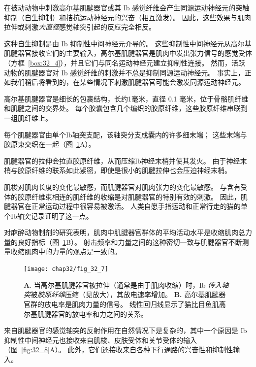在被动动物中刺激高尔基肌腱器官或其 Ib 感觉纤维会产生同源运动神经元的突触抑制（自生抑制）和拮抗运动神经元的兴奋（相互激发）。
因此，这些效果与肌肉拉伸或刺激\textit{大直径}感觉轴突引起的反应完全相反。


这种自生抑制是由 Ib 抑制性中间神经元介导的。
这些抑制性中间神经元从高尔基肌腱器官接收它们的主要输入，高尔基肌腱器官是肌肉中发出张力信号的感觉受体（方框~\ref{box:32_4}），并且它们与同名运动神经元建立抑制性连接。
然而，活跃动物的肌腱器官对 Ib 感觉纤维的刺激并不总是抑制同源运动神经元。
事实上，正如我们稍后将看到的，在某些情况下刺激肌腱器官可能会激发同源运动神经元。


\begin{proposition}[神经解剖学导航术语] \label{box:32_4}
	
	\quad \quad 高尔基肌腱器官是细长的包裹结构，长约1毫米，直径 0.1 毫米，位于骨骼肌纤维和肌腱之间的交界处。
	每个胶囊包含几个编织的胶原纤维，这些胶原纤维串联到一组肌纤维上。
	
	\quad \quad 每个肌腱器官由单个Ib轴突支配，该轴突分支成囊内的许多细末端；
	这些末端与胶原束交织在一起（图~\ref{fig:32_7}A）。
	
	\quad \quad 肌腱器官的拉伸会拉直胶原纤维，从而压缩Ib神经末梢并使其发火。
	由于神经末梢与胶原纤维的联系如此紧密，即使是很小的肌腱拉伸也会压迫神经末梢。
	
	\quad \quad 肌梭对肌肉长度的变化最敏感，而肌腱器官对肌肉张力的变化最敏感。
	与含有受体的胶原纤维束相连的肌纤维的收缩是对肌腱器官的特别有效的刺激。
	因此，肌腱器官在正常运动过程中很容易被激活。
	人类自愿手指运动和正常行走的猫的单个Ib轴突记录证明了这一点。
	
	\quad \quad 对麻醉动物制剂的研究表明，肌肉中肌腱器官群体的平均活动水平是收缩肌肉总力量的良好指标（图~\ref{fig:32_7}B）。
	射击频率和力量之间的这种密切一致与肌腱器官不断测量收缩肌肉中的力量的观点是一致的。
	
\end{proposition}


\begin{figure}[htbp]
	\centering
	\texttt{[image: chap32/fig\_32\_7]}
	\caption{\textbf{A}. 当高尔基肌腱器官被拉伸（通常是由于肌肉收缩）时，Ib \textit{传入轴突}被\textit{胶原纤维}压缩（见放大），其放电速率增加\cite{biederman2013human}。
	\textbf{B.} 高尔基肌腱器官群的放电率是肌肉力量的信号。
	线性回归线显示了猫比目鱼肌高尔基肌腱器官的放电率和力之间的关系\cite{crago1982sampling}。}
	\label{fig:32_7}
\end{figure}


来自肌腱器官的感觉轴突的反射作用在自然情况下是复杂的，其中一个原因是 Ib 抑制性中间神经元也接收来自肌梭、皮肤受体和关节受体的输入（图~\ref{fig:32_8}A）。
此外，它们还接收来自各种下行通路的兴奋性和抑制性输入。


